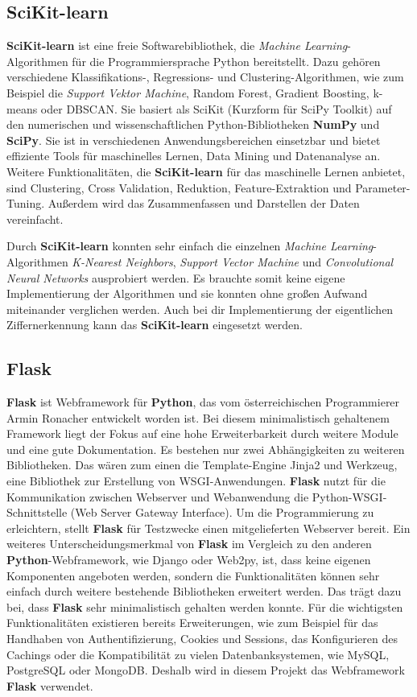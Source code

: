 \subsection{SciKit-learn}
\textbf{SciKit-learn} ist eine freie Softwarebibliothek, die \textit{Machine Learning}-Algorithmen für die Programmiersprache Python bereitstellt. 
Dazu gehören verschiedene Klassifikations-, Regressions- und Clustering-Algorithmen, wie zum Beispiel die \textit{Support Vektor Machine}, 
Random Forest, Gradient Boosting, k-means oder DBSCAN. Sie basiert als SciKit (Kurzform für SciPy Toolkit)
auf den numerischen und wissenschaftlichen Python-Bibliotheken \textbf{NumPy} und \textbf{SciPy}.
Sie ist in verschiedenen Anwendungsbereichen einsetzbar und bietet effiziente Tools für maschinelles Lernen, Data Mining und Datenanalyse an.
Weitere Funktionalitäten, die \textbf{SciKit-learn} für das maschinelle Lernen anbietet, sind Clustering, Cross Validation, Reduktion, Feature-Extraktion und Parameter-Tuning.
Außerdem wird das Zusammenfassen und Darstellen der Daten vereinfacht.

Durch \textbf{SciKit-learn} konnten sehr einfach die einzelnen \textit{Machine Learning}-Algorithmen \textit{K-Nearest Neighbors}, \textit{Support Vector Machine} und
\textit{Convolutional Neural Networks} ausprobiert werden. Es brauchte somit keine eigene Implementierung der Algorithmen und sie konnten ohne großen Aufwand
miteinander verglichen werden. Auch bei dir Implementierung der eigentlichen Ziffernerkennung kann das \textbf{SciKit-learn} eingesetzt werden.

\subsection{Flask}
\textbf{Flask} ist Webframework für \textbf{Python}, das vom österreichischen Programmierer Armin Ronacher entwickelt worden ist.
Bei diesem minimalistisch gehaltenem Framework liegt der Fokus auf eine hohe Erweiterbarkeit durch weitere Module und eine gute Dokumentation.
Es bestehen nur zwei Abhängigkeiten zu weiteren Bibliotheken. Das wären zum einen die Template-Engine Jinja2 und Werkzeug, eine Bibliothek zur Erstellung
von WSGI-Anwendungen. \textbf{Flask} nutzt für die Kommunikation zwischen Webserver und Webanwendung die Python-WSGI-Schnittstelle (Web Server Gateway Interface).
Um die Programmierung zu erleichtern, stellt \textbf{Flask} für Testzwecke einen mitgelieferten Webserver bereit. Ein weiteres Unterscheidungsmerkmal von \textbf{Flask}
im Vergleich zu den anderen \textbf{Python}-Webframework, wie Django oder Web2py, ist, dass keine eigenen Komponenten angeboten werden, sondern die Funktionalitäten können
sehr einfach durch weitere bestehende Bibliotheken erweitert werden. Das trägt dazu bei, dass \textbf{Flask} sehr minimalistisch gehalten werden konnte.
Für die wichtigsten Funktionalitäten existieren bereits Erweiterungen, wie zum Beispiel für das Handhaben von Authentifizierung, Cookies und Sessions, das Konfigurieren
des Cachings oder die Kompatibilität zu vielen Datenbanksystemen, wie MySQL, PostgreSQL oder MongoDB. 
Deshalb wird in diesem Projekt das Webframework \textbf{Flask} verwendet.

